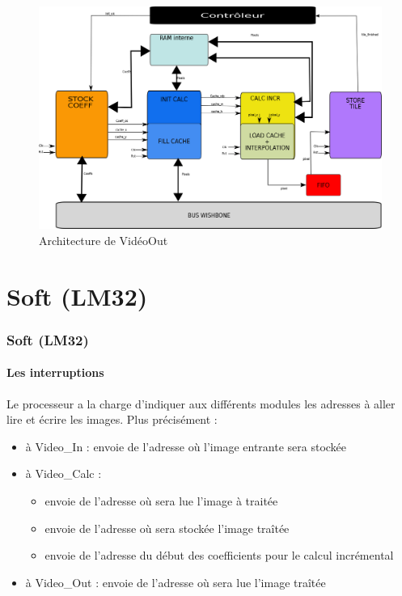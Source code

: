 \documentclass[a4paper,12pt]{report}
\begin{document}
{{\begin{figure}[!h]
	\centering
	\includegraphics[scale = 0.15]{video_calc_verilog.png}
	\caption{Architecture de VidéoOut}
\end{figure}

    \part{Soft (LM32)}

    \section*{Soft (LM32)}


		\subsection*{Les interruptions}
{Le processeur a la charge d'indiquer aux différents modules les adresses à aller lire et écrire les images. Plus précisément :

\begin{itemize}
	\item à Video\_In : envoie de l'adresse où l'image entrante sera stockée
	\item à Video\_Calc : \begin{itemize}
								\item envoie de l'adresse où sera lue l'image à traitée
								\item envoie de l'adresse où sera stockée l'image traîtée
								\item envoie de l'adresse du début des coefficients pour le calcul incrémental
							\end{itemize}
	\item à Video\_Out : envoie de l'adresse où sera lue l'image traîtée
\end{itemize}

}}}
\end{document}
